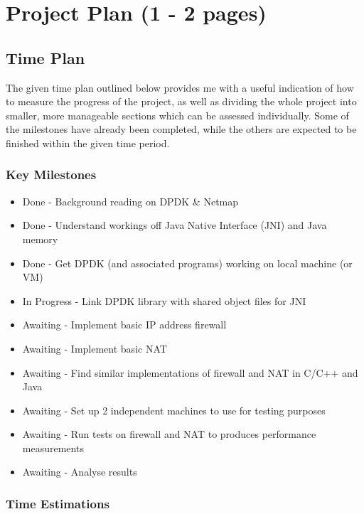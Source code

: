 \documentclass[a4paper, titlepage]{article}
\begin{document}
\newpage

\section{Project Plan (1 - 2 pages)}
\subsection{Time Plan}
The given time plan outlined below provides me with a useful indication of how to measure the progress of the project, as well as dividing the whole project into smaller, more manageable sections which can be assessed individually. Some of the milestones have already been completed, while the others are expected to be finished within the given time period.
\subsubsection{Key Milestones}
\begin{itemize}
	\item Done - Background reading on DPDK \& Netmap
	\item Done - Understand workings off Java Native Interface (JNI) and Java memory
	\item Done - Get DPDK (and associated programs) working on local machine (or VM)
	\item In Progress - Link DPDK library with shared object files for JNI
	\item Awaiting - Implement basic IP address firewall
	\item Awaiting - Implement basic NAT
	\item Awaiting - Find similar implementations of firewall and NAT in C/C++ and Java
	\item Awaiting - Set up 2 independent machines to use for testing purposes
	\item Awaiting - Run tests on firewall and NAT to produces performance measurements
	\item Awaiting - Analyse results
\end{itemize}

\subsubsection{Time Estimations}
\end{document}
